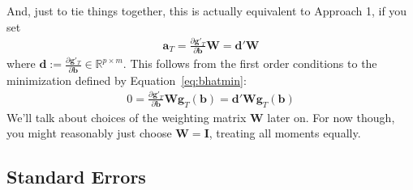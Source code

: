 \documentclass[12pt]{article}
\theoremstyle{plain}
\theoremstyle{definition}
\theoremstyle{remark}
\begin{document}
\begin{enumerate}
    And, just to tie things together, this is actually equivalent to
    Approach 1, if you set
    \begin{align}
      \boldsymbol{a}_T =
      \frac{\partial \boldsymbol{g}'_T}{\partial \boldsymbol{b}}
      \boldsymbol{W}
      =
      \boldsymbol{d}'
      \boldsymbol{W}
      \label{eq:equivrep}
    \end{align}
    where $\boldsymbol{d}
    :=\frac{\partial \boldsymbol{g}'_T}{\partial \boldsymbol{b}}
    \in \mathbb{R}^{p\times m}$.
    This follows from the first order conditions to the minimization
    defined by Equation~\ref{eq:bhatmin}:
    \begin{align*}
      0
      = \frac{\partial \boldsymbol{g}'_T}{\partial \boldsymbol{b}}
      \boldsymbol{W} \boldsymbol{g}_T(\boldsymbol{b})
      = \boldsymbol{d}'
      \boldsymbol{W} \boldsymbol{g}_T(\boldsymbol{b})
    \end{align*}
    We'll talk about choices of the weighting matrix
    $\boldsymbol{W}$ later on. For now though, you might reasonably just
    choose $\boldsymbol{W}=\boldsymbol{I}$, treating all moments
    equally.
\end{enumerate}

\subsection{Standard Errors}
\end{document}
